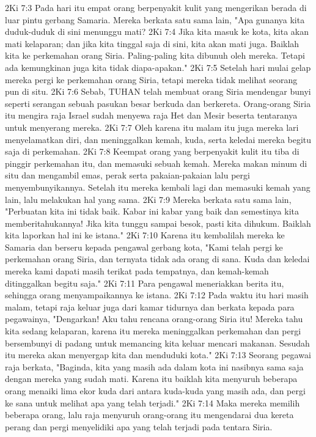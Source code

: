 2Ki 7:3  Pada hari itu empat orang berpenyakit kulit yang mengerikan berada di luar pintu gerbang Samaria. Mereka berkata satu sama lain, "Apa gunanya kita duduk-duduk di sini menunggu mati?
2Ki 7:4  Jika kita masuk ke kota, kita akan mati kelaparan; dan jika kita tinggal saja di sini, kita akan mati juga. Baiklah kita ke perkemahan orang Siria. Paling-paling kita dibunuh oleh mereka. Tetapi ada kemungkinan juga kita tidak diapa-apakan."
2Ki 7:5  Setelah hari mulai gelap mereka pergi ke perkemahan orang Siria, tetapi mereka tidak melihat seorang pun di situ.
2Ki 7:6  Sebab, TUHAN telah membuat orang Siria mendengar bunyi seperti serangan sebuah pasukan besar berkuda dan berkereta. Orang-orang Siria itu mengira raja Israel sudah menyewa raja Het dan Mesir beserta tentaranya untuk menyerang mereka.
2Ki 7:7  Oleh karena itu malam itu juga mereka lari menyelamatkan diri, dan meninggalkan kemah, kuda, serta keledai mereka begitu saja di perkemahan.
2Ki 7:8  Keempat orang yang berpenyakit kulit itu tiba di pinggir perkemahan itu, dan memasuki sebuah kemah. Mereka makan minum di situ dan mengambil emas, perak serta pakaian-pakaian lalu pergi menyembunyikannya. Setelah itu mereka kembali lagi dan memasuki kemah yang lain, lalu melakukan hal yang sama.
2Ki 7:9  Mereka berkata satu sama lain, "Perbuatan kita ini tidak baik. Kabar ini kabar yang baik dan semestinya kita memberitahukannya! Jika kita tunggu sampai besok, pasti kita dihukum. Baiklah kita laporkan hal ini ke istana."
2Ki 7:10  Karena itu kembalilah mereka ke Samaria dan berseru kepada pengawal gerbang kota, "Kami telah pergi ke perkemahan orang Siria, dan ternyata tidak ada orang di sana. Kuda dan keledai mereka kami dapati masih terikat pada tempatnya, dan kemah-kemah ditinggalkan begitu saja."
2Ki 7:11  Para pengawal meneriakkan berita itu, sehingga orang menyampaikannya ke istana.
2Ki 7:12  Pada waktu itu hari masih malam, tetapi raja keluar juga dari kamar tidurnya dan berkata kepada para pegawainya, "Dengarkan! Aku tahu rencana orang-orang Siria itu! Mereka tahu kita sedang kelaparan, karena itu mereka meninggalkan perkemahan dan pergi bersembunyi di padang untuk memancing kita keluar mencari makanan. Sesudah itu mereka akan menyergap kita dan menduduki kota."
2Ki 7:13  Seorang pegawai raja berkata, "Baginda, kita yang masih ada dalam kota ini nasibnya sama saja dengan mereka yang sudah mati. Karena itu baiklah kita menyuruh beberapa orang menaiki lima ekor kuda dari antara kuda-kuda yang masih ada, dan pergi ke sana untuk melihat apa yang telah terjadi."
2Ki 7:14  Maka mereka memilih beberapa orang, lalu raja menyuruh orang-orang itu mengendarai dua kereta perang dan pergi menyelidiki apa yang telah terjadi pada tentara Siria.
